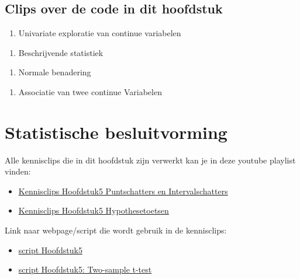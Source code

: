 \documentclass[
  12pt,dutch,coursenotes]{book}
\providecommand{\tightlist}{%
  \setlength{\itemsep}{0pt}\setlength{\parskip}{0pt}}
\theoremstyle{definition}
\theoremstyle{definition}
\theoremstyle{definition}
\theoremstyle{remark}
\begin{document}
\hypertarget{clips-over-de-code-in-dit-hoofdstuk}{%
\section{Clips over de code in dit hoofdstuk}\label{clips-over-de-code-in-dit-hoofdstuk}}

\begin{enumerate}
\def\labelenumi{\arabic{enumi}.}
\tightlist
\item
  Univariate exploratie van continue variabelen
\end{enumerate}

\begin{enumerate}
\def\labelenumi{\arabic{enumi}.}
\setcounter{enumi}{1}
\tightlist
\item
  Beschrijvende statistiek
\end{enumerate}

\begin{enumerate}
\def\labelenumi{\arabic{enumi}.}
\setcounter{enumi}{2}
\tightlist
\item
  Normale benadering
\end{enumerate}

\begin{enumerate}
\def\labelenumi{\arabic{enumi}.}
\setcounter{enumi}{3}
\tightlist
\item
  Associatie van twee continue Variabelen
\end{enumerate}

\hypertarget{chap:besluit}{%
\chapter{Statistische besluitvorming}\label{chap:besluit}}

Alle kennisclips die in dit hoofdstuk zijn verwerkt kan je in deze youtube playlist vinden:

\begin{itemize}
\item
  \href{https://www.youtube.com/playlist?list=PLZH1hP8_LbJKyD9Jw5cqd-btYs11f9tkz}{Kennisclips Hoofdstuk5 Puntschatters en Intervalschatters}
\item
  \href{https://www.youtube.com/playlist?list=PLZH1hP8_LbJKEtDy2errIWf8hLJODw-jK}{Kennisclips Hoofdstuk5 Hypothesetoetsen}
\end{itemize}

Link naar webpage/script die wordt gebruik in de kennisclips:

\begin{itemize}
\item
  \href{https://statomics.github.io/sbc20/rmd/05-statisticalInference.html}{script Hoofdstuk5}
\item
  \href{https://statomics.github.io/sbc20/rmd/05-statisticalInference-twosampleT.html}{script Hoofdstuk5: Two-sample t-test}
\end{itemize}
\end{document}
